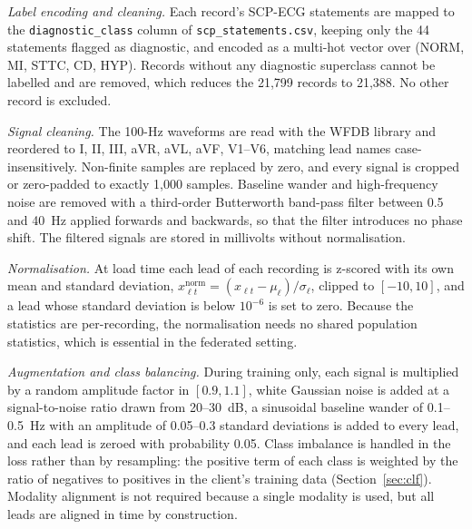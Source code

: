 \textit{Label encoding and cleaning.} Each record's SCP-ECG statements are mapped to the
\texttt{diagnostic\_class} column of \texttt{scp\_statements.csv}, keeping only the 44 statements
flagged as diagnostic, and encoded as a multi-hot vector over (NORM, MI, STTC, CD, HYP). Records
without any diagnostic superclass cannot be labelled and are removed, which reduces the 21,799
records to 21,388. No other record is excluded.

\textit{Signal cleaning.} The 100-Hz waveforms are read with the WFDB library and reordered to I,
II, III, aVR, aVL, aVF, V1--V6, matching lead names case-insensitively. Non-finite samples are
replaced by zero, and every signal is cropped or zero-padded to exactly 1,000 samples. Baseline
wander and high-frequency noise are removed with a third-order Butterworth band-pass filter between
0.5 and 40~Hz applied forwards and backwards, so that the filter introduces no phase shift. The
filtered signals are stored in millivolts without normalisation.

\textit{Normalisation.} At load time each lead of each recording is z-scored with its own mean and
standard deviation, $x^{\mathrm{norm}}_{\ell t}=(x_{\ell t}-\mu_\ell)/\sigma_\ell$, clipped to $[-10,10]$, and a
lead whose standard deviation is below $10^{-6}$ is set to zero. Because the statistics are
per-recording, the normalisation needs no shared population statistics, which is essential in the
federated setting.

\textit{Augmentation and class balancing.} During training only, each signal is multiplied by a
random amplitude factor in $[0.9,1.1]$, white Gaussian noise is added at a signal-to-noise ratio
drawn from 20--30~dB, a sinusoidal baseline wander of 0.1--0.5~Hz with an amplitude of 0.05--0.3
standard deviations is added to every lead, and each lead is zeroed with probability 0.05. Class
imbalance is handled in the loss rather than by resampling: the positive term of each class is
weighted by the ratio of negatives to positives in the client's training data
(Section~\ref{sec:clf}). Modality alignment is not required because a single modality is used, but
all leads are aligned in time by construction.

